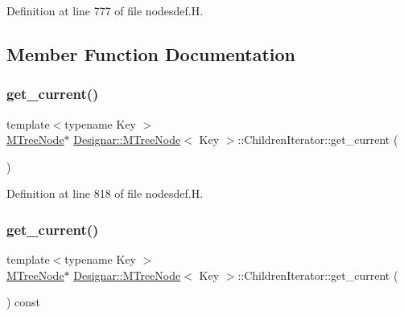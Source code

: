 Definition at line 777 of file nodesdef.\+H.



\subsection{Member Function Documentation}
\mbox{\label{class_designar_1_1_m_tree_node_1_1_children_iterator_a3ff90febfde4709c61d50107ce9761d5}} 
\subsubsection{\texorpdfstring{get\+\_\+current()}{get\_current()}\hspace{0.1cm}{\footnotesize\ttfamily [1/2]}}
{\footnotesize\ttfamily template$<$typename Key $>$ \\
\hyperlink{class_designar_1_1_m_tree_node}{M\+Tree\+Node}$\ast$ \hyperlink{class_designar_1_1_m_tree_node}{Designar\+::\+M\+Tree\+Node}$<$ Key $>$\+::Children\+Iterator\+::get\+\_\+current (\begin{DoxyParamCaption}{ }\end{DoxyParamCaption})\hspace{0.3cm}{\ttfamily [inline]}}



Definition at line 818 of file nodesdef.\+H.

\mbox{\label{class_designar_1_1_m_tree_node_1_1_children_iterator_a70ef87f4fdd20504fdb9927f49dc847d}} 
\subsubsection{\texorpdfstring{get\+\_\+current()}{get\_current()}\hspace{0.1cm}{\footnotesize\ttfamily [2/2]}}
{\footnotesize\ttfamily template$<$typename Key $>$ \\
\hyperlink{class_designar_1_1_m_tree_node}{M\+Tree\+Node}$\ast$ \hyperlink{class_designar_1_1_m_tree_node}{Designar\+::\+M\+Tree\+Node}$<$ Key $>$\+::Children\+Iterator\+::get\+\_\+current (\begin{DoxyParamCaption}{ }\end{DoxyParamCaption}) const\hspace{0.3cm}{\ttfamily [inline]}}



